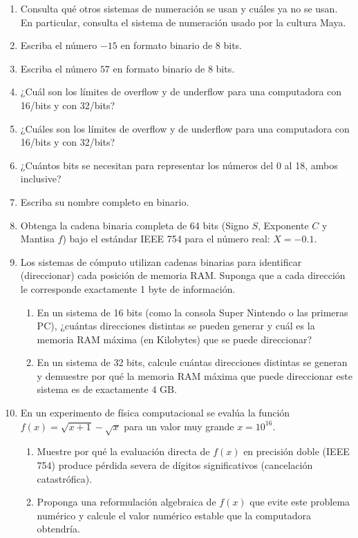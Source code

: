 \documentclass[12pt]{article}
\begin{document}
\begin{problemas}[]
	\begin{enumerate}
		\item Consulta qué otros sistemas de numeración se usan y cuáles ya no se usan.
			  En particular, consulta el sistema de numeración usado por la cultura Maya.
		\item Escriba el número $-15$ en formato binario de $8$ bits.
		\item Escriba el número $57$ en formato binario de $8$ bits.
		\item ¿Cuál son los límites de overflow y de underflow para una computadora con 16/bits y 
         con 32/bits?
		\item ¿Cuáles son los límites de overflow y de underflow para una computadora con 16/bits y 
         con 32/bits?
         \item ¿Cuántos bits se necesitan para representar los números del 0 al 18, ambos inclusive?
		\item Escriba su nombre completo en binario.
        \item Obtenga la cadena binaria completa de 64 bits 
        (Signo $S$, Exponente $C$ y Mantisa $f$) bajo el estándar IEEE 754 para el número real:
        $X = -0.1$.
        \item Los sistemas de cómputo utilizan cadenas binarias para identificar (direccionar) cada posición de memoria RAM. Suponga que a cada dirección le corresponde exactamente 1 byte de información.
            \begin{enumerate}[label=\alph*)]
            \item En un sistema de 16 bits (como la consola Super Nintendo o las primeras PC), ¿cuántas direcciones distintas se pueden generar y cuál es la memoria RAM máxima (en Kilobytes) que se puede direccionar?
            \item En un sistema de 32 bits, calcule cuántas direcciones distintas se generan y demuestre por qué la memoria RAM máxima que puede direccionar este sistema es de exactamente $4\text{ GB}$.
            \end{enumerate}
        \item En un experimento de física computacional se evalúa la función $f(x) = \sqrt{x + 1} - \sqrt{x}$ para un valor muy grande $x = 10^{16}$.
            \begin{enumerate}[label=\alph*)]
            \item Muestre por qué la evaluación directa de $f(x)$ en precisión doble (IEEE 754) produce pérdida severa de dígitos significativos (cancelación catastrófica).
            \item Proponga una reformulación algebraica de $f(x)$ que evite este problema numérico y calcule el valor numérico estable que la computadora obtendría.
            \end{enumerate}
\end{enumerate}

\end{problemas}
\end{document}
